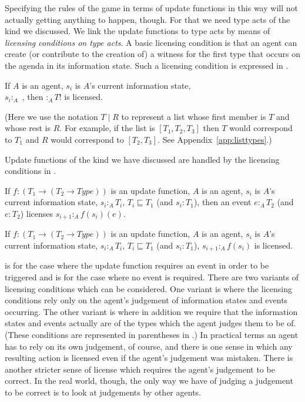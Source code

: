 Specifying the rules of the game in terms of update functions in this way will not actually getting
anything to happen, though.  For that we need type acts of the kind we
discussed. We link the update functions to type acts by means of
\textit{licensing conditions on type acts}.  A basic licensing
condition is that an agent can create (or contribute to the creation
of) a witness for the first type that occurs on the agenda in its
information state.  Such a licensing condition is expressed in
\nexteg{}.
\begin{ex} 
If $A$ is an agent, $s_i$ is $A$'s current information state, \\ $s_i
:_A$ , then $:_A T!$ is licensed. 
\end{ex}
(Here we use the notation $T\!\mid\!R$ to represent a list whose first
member is $T$ and whose rest is $R$.  For example, if the list is
$[T_1,T_2,T_3]$ then $T$ would correspond to $T_1$ and $R$ would
correspond to $[T_2,T_3]$. See Appendix~\ref{app:listtypes}.) 

Update functions of the kind we have discussed are handled by the
licensing conditions in \nexteg{}.
\begin{ex} 
\begin{subex} 
 
\item If $f:(T_1\rightarrow(T_2\rightarrow\textit{Type}))$ is an update
function, $A$ is an agent, $s_i$ is $A$'s current information state,
$s_i:_A T_i$, $T_i\sqsubseteq T_1$ (and $s_i:T_1$), then an event $e:_A
T_2$ (and $e:T_2$) licenses $s_{i+1}:_A f(s_i)(e)$. 
 
\item If $f:(T_1\rightarrow(T_2\rightarrow\textit{Type}))$ is an update
function, $A$ is an agent, $s_i$ is $A$'s current information state,
$s_i:_A T_i$, $T_i\sqsubseteq T_1$ (and $s_i:T_1$), $s_{i+1}:_A
f(s_i)$ is licensed. 
 
\end{subex} 
   
\end{ex} 
 is for the case where the update function requires an event in
order to be triggered and  is for the case where no event is
required. There are two variants of licensing conditions which can be
considered.  One variant is where the licensing conditions rely only
on the agent's judgement of information states and events occurring.
The other variant is where in addition we require that the information
states and events actually are of the types which the agent judges
them to be of.  (These conditions are represented in parentheses in
\preveg{}.)  In practical terms an agent has to rely on its own
judgement, of course, and there is one sense in which any resulting
action is licensed even if the agent's judgement was mistaken.  There
is another stricter sense of license which requires the agent's
judgement to be correct.  In the real world, though, the only way we
have of judging a judgement to be correct is to look at judgements by
other agents.


